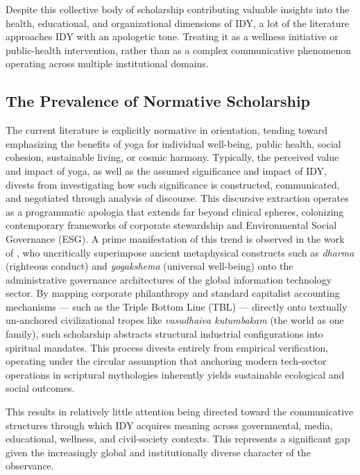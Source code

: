 \documentclass[11pt]{article}
\begin{document}
Despite this collective body of scholarship contributing valuable insights into the health, educational, and organizational dimensions of IDY, a lot of the literature approaches IDY with an apologetic tone. Treating it as a wellness initiative or public-health intervention, rather than as a complex communicative phenomenon operating across multiple institutional domains.


\subsection{The Prevalence of Normative Scholarship}

The current literature is explicitly normative in orientation, tending toward emphasizing the benefits of yoga for individual well-being, public health, social cohesion, sustainable living, or cosmic harmony. Typically, the perceived value and impact of yoga, as well as the assumed significance and impact of IDY, divests from investigating how such significance is constructed, communicated, and negotiated through analysis of discourse. This discursive extraction operates as a programmatic apologia that extends far beyond clinical spheres, colonizing contemporary frameworks of corporate stewardship and Environmental Social Governance (ESG). A prime manifestation of this trend is observed in the work of \citet{sadineni2024reimagining}, who uncritically superimpose ancient metaphysical constructs such as \textit{dharma} (righteous conduct) and \textit{yogakshema} (universal well-being) onto the administrative governance architectures of the global information technology sector. By mapping corporate philanthropy and standard capitalist accounting mechanisms — such as the Triple Bottom Line (TBL) — directly onto textually un-anchored civilizational tropes like \textit{vasudhaiva kutumbakam} (the world as one family), such scholarship abstracts structural industrial configurations into spiritual mandates. This process divests entirely from empirical verification, operating under the circular assumption that anchoring modern tech-sector operations in scriptural mythologies inherently yields sustainable ecological and social outcomes.

This results in relatively little attention being directed toward the communicative structures through which IDY acquires meaning across governmental, media, educational, wellness, and civil-society contexts. This represents a significant gap given the increasingly global and institutionally diverse character of the observance.
\end{document}
